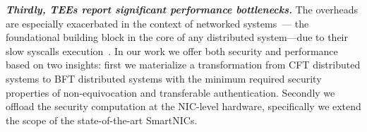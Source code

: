 



{\bf \em Thirdly, TEEs report significant performance bottlenecks.} The overheads are especially exacerbated in the context of networked systems~\cite{avocado, treaty, minBFT,10.1145/3492321.3519568}--- the foundational building block in the core of any distributed system---due to their slow syscalls execution~\cite{hotcalls}. In our work we offer both security and performance based on two insights: first we materialize a transformation from CFT distributed systems to BFT distributed systems with the minimum required security properties of non-equivocation and transferable authentication. Secondly we offload the security computation at the NIC-level hardware, specifically we extend the scope of the state-of-the-art SmartNICs.




